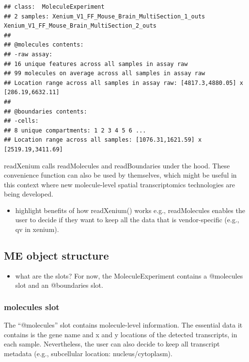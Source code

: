 \documentclass[
]{article}
\providecommand{\tightlist}{%
  \setlength{\itemsep}{0pt}\setlength{\parskip}{0pt}}
\begin{document}
\begin{verbatim}
## class:  MoleculeExperiment 
## 2 samples: Xenium_V1_FF_Mouse_Brain_MultiSection_1_outs Xenium_V1_FF_Mouse_Brain_MultiSection_2_outs 
## 
## @molecules contents: 
## -raw assay:
## 16 unique features across all samples in assay raw
## 99 molecules on average across all samples in assay raw
## Location range across all samples in assay raw: [4817.3,4880.05] x [286.19,6632.11]
## 
## @boundaries contents:
## -cells:
## 8 unique compartments: 1 2 3 4 5 6 ...
## Location range across all samples: [1076.31,1621.59] x [2519.19,3411.69]
\end{verbatim}

readXenium calls readMolecules and readBoundaries under the hood. These
convenience function can also be used by themselves, which might be
useful in this context where new molecule-level spatial transcriptomics
technologies are being developed.

\begin{itemize}
\tightlist
\item
  highlight benefits of how readXenium() works e.g., readMolecules
  enables the user to decide if they want to keep all the data that is
  vendor-specific (e.g., qv in xenium).
\end{itemize}

\hypertarget{me-object-structure}{%
\subsection{ME object structure}\label{me-object-structure}}

\begin{itemize}
\tightlist
\item
  what are the slots? For now, the MoleculeExperiment contains a
  @molecules slot and an @boundaries slot.
\end{itemize}

\hypertarget{molecules-slot}{%
\subsubsection{molecules slot}\label{molecules-slot}}

The ``@molecules'' slot contains molecule-level information. The
essential data it contains is the gene name and x and y locations of the
detected transcripts, in each sample. Nevertheless, the user can also
decide to keep all transcript metadata (e.g., subcellular location:
nucleus/cytoplasm).
\end{document}
